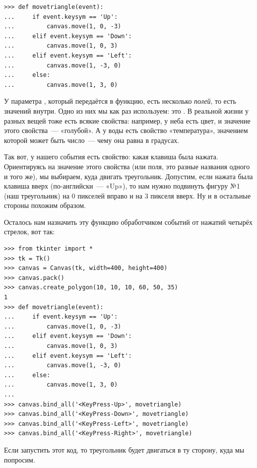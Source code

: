 \begin{listing}
\begin{verbatim}
>>> def movetriangle(event):
...     if event.keysym == 'Up':
...         canvas.move(1, 0, -3)
...     elif event.keysym == 'Down':
...         canvas.move(1, 0, 3)
...     elif event.keysym == 'Left':
...         canvas.move(1, -3, 0)
...     else:
...         canvas.move(1, 3, 0)
\end{verbatim}
\end{listing}

У параметра , который передаётся в функцию, есть несколько \emph{полей}, то есть значений внутри. Одно из них мы как раз используем: это . В реальной жизни у разных вещей тоже есть всякие свойства: например, у неба есть цвет, и значение этого свойства — «голубой». А у воды есть свойство «температура», значением которой может быть число — чему она равна в градусах.

Так вот, у нашего события есть свойство: какая клавиша была нажата. Ориентируясь на значение этого свойства (или поля, это разные названия одного и того же), мы выбираем, куда двигать треугольник. Допустим, если нажата была клавиша вверх (по-английски — «Up»), то нам нужно подвинуть фигуру №1 (наш треугольник) на 0 пикселей вправо и на 3 пикселя вверх. Ну и в остальные стороны похожим образом.

Осталось нам назначить эту функцию обработчиком событий от нажатий четырёх стрелок, вот так:

\begin{listing}
\begin{verbatim}
>>> from tkinter import *
>>> tk = Tk()
>>> canvas = Canvas(tk, width=400, height=400)
>>> canvas.pack()
>>> canvas.create_polygon(10, 10, 10, 60, 50, 35)
1 
>>> def movetriangle(event):
...     if event.keysym == 'Up':
...         canvas.move(1, 0, -3)
...     elif event.keysym == 'Down':
...         canvas.move(1, 0, 3)
...     elif event.keysym == 'Left':
...         canvas.move(1, -3, 0)
...     else:
...         canvas.move(1, 3, 0)
... 
>>> canvas.bind_all('<KeyPress-Up>', movetriangle)
>>> canvas.bind_all('<KeyPress-Down>', movetriangle)
>>> canvas.bind_all('<KeyPress-Left>', movetriangle)
>>> canvas.bind_all('<KeyPress-Right>', movetriangle)
\end{verbatim}
\end{listing}

Если запустить этот код, то треугольник будет двигаться в ту сторону, куда мы попросим.

\newpage
